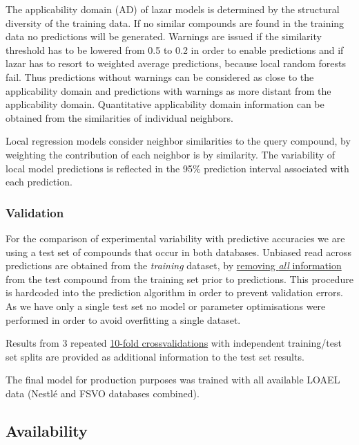 \documentclass[]{achemso}
\begin{document}
The applicability domain (AD) of lazar models is determined by the
structural diversity of the training data. If no similar compounds are
found in the training data no predictions will be generated. Warnings
are issued if the similarity threshold has to be lowered from 0.5 to 0.2
in order to enable predictions and if lazar has to resort to weighted
average predictions, because local random forests fail. Thus predictions
without warnings can be considered as close to the applicability domain
and predictions with warnings as more distant from the applicability
domain. Quantitative applicability domain information can be obtained
from the similarities of individual neighbors.

Local regression models consider neighbor similarities to the query
compound, by weighting the contribution of each neighbor is by
similarity. The variability of local model predictions is reflected in
the 95\% prediction interval associated with each prediction.

\subsubsection{Validation}\label{validation}

For the comparison of experimental variability with predictive
accuracies we are using a test set of compounds that occur in both
databases. Unbiased read across predictions are obtained from the
\emph{training} dataset, by
\href{https://github.com/opentox/lazar/blob/loael-paper.submission/lib/model.rb\#L234-L238}{removing
\emph{all} information} from the test compound from the training set
prior to predictions. This procedure is hardcoded into the prediction
algorithm in order to prevent validation errors. As we have only a
single test set no model or parameter optimisations were performed in
order to avoid overfitting a single dataset.

Results from 3 repeated
\href{https://github.com/opentox/lazar/blob/loael-paper.submission/lib/crossvalidation.rb\#L85-L93}{10-fold
crossvalidations} with independent training/test set splits are provided
as additional information to the test set results.

The final model for production purposes was trained with all available
LOAEL data (Nestlé and FSVO databases combined).

\subsection{Availability}\label{availability}
\end{document}
